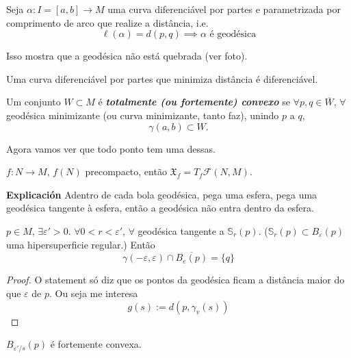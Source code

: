 \begin{coro}\leavevmode
	Seja \(\alpha:I=[a,b] \longrightarrow M\) uma curva diferenciável por partes e parametrizada por comprimento de arco que realize a distância, i.e.
	 \[\ell(\alpha)=d(p,q) \implies  \alpha \text{ é geodésica} \]
	
\end{coro}

Isso mostra que a geodésica não está quebrada (ver foto).

\begin{remark}\leavevmode
Uma curva diferenciável por partes que minimiza distância é diferenciável.
\end{remark}

\begin{defn}\leavevmode
Um conjunto \(W \subset M\) é \textit{\textbf{totalmente (ou fortemente) convexo}} se \(\forall p,q \in \overline{W}\), \(\forall \) geodésica minimizante (ou curva minimizante, tanto faz), unindo \(p\) a \(q\),
\[\gamma(a,b) \subset W.\]
\end{defn}

Agora vamos ver que todo ponto tem uma dessas.

\begin{prop}\leavevmode
\(f:N \to M\), \(f(N)\) precompacto, então \(\mathfrak{X}_f = T_f \mathcal{F}(N,M)\).
\end{prop}

\begin{lemma}\leavevmode
\textbf{Explicación} Adentro de cada bola geodésica, pega uma esfera, pega uma geodésica tangente à esfera, então a geodésica não entra dentro da esfera.

	\(p \in M\), \(\exists  \varepsilon'>0\). \(\forall  0 <r< \varepsilon'\), \(\forall \) geodésica tangente a \(\mathbb{S}_r(p)\). (\(\mathbb{S}_r(p) \subset B_\varepsilon(p)\) uma hipersuperficie regular.) Então
	\[\gamma(-\varepsilon,\varepsilon) \cap \overline{ B_e(p)}=\{q\}\]
\end{lemma}

\begin{proof}\leavevmode
O statement só diz que os pontos da geodésica ficam a distância maior do que \(\varepsilon\) de \(p\). Ou seja me interesa
\[g(s):=d(p,\gamma_v(s))\]

\end{proof}

\begin{coro}\leavevmode
\(B_{\varepsilon'/s}(p)\) é fortemente convexa.
\end{coro}

